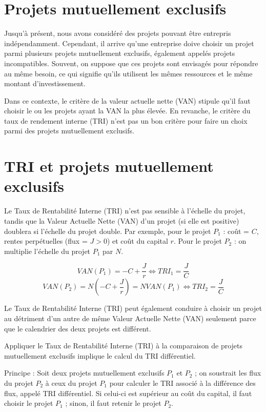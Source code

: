 \documentclass[a4paper, 12pt]{report}
\begin{document}
\section{Projets mutuellement exclusifs}

Jusqu'à présent, nous avons considéré des projets pouvant être entrepris indépendamment. Cependant, il arrive qu'une entreprise doive choisir un projet parmi plusieurs projets mutuellement exclusifs, également appelés projets incompatibles. Souvent, on suppose que ces projets sont envisagés pour répondre au même besoin, ce qui signifie qu'ils utilisent les mêmes ressources et le même montant d'investissement.

Dans ce contexte, le critère de la valeur actuelle nette (VAN) stipule qu'il faut choisir le ou les projets ayant la VAN la plus élevée. En revanche, le critère du taux de rendement interne (TRI) n'est pas un bon critère pour faire un choix parmi des projets mutuellement exclusifs.

\section{TRI et projets mutuellement exclusifs}

Le Taux de Rentabilité Interne (TRI) n'est pas sensible à l'échelle du projet, tandis que la Valeur Actuelle Nette (VAN) d'un projet (si elle est positive) doublera si l'échelle du projet double. Par exemple, pour le projet \( P_1 \) : coût = \( C \), rentes perpétuelles (flux = \( J > 0 \)) et coût du capital \( r \). Pour le projet \( P_2 \) : on multiplie l'échelle du projet \( P_1 \) par \( N \).

\[ VAN(P_1)=-C+\frac{J}{r}\Leftrightarrow TRI_1=\frac{J}{C} \]
\[ VAN(P_2)=N\left( -C+\frac{J}{r}\right) = NVAN(P_1)\Leftrightarrow TRI_2=\frac{J}{C} \]

Le Taux de Rentabilité Interne (TRI) peut également conduire à choisir un projet au détriment d'un autre de même Valeur Actuelle Nette (VAN) seulement parce que le calendrier des deux projets est différent.

Appliquer le Taux de Rentabilité Interne (TRI) à la comparaison de projets mutuellement exclusifs implique le calcul du TRI différentiel. 

Principe : Soit deux projets mutuellement exclusifs \( P_1 \) et \( P_2 \) ; on soustrait les flux du projet \( P_2 \) à ceux du projet \( P_1 \) pour calculer le TRI associé à la différence des flux, appelé TRI différentiel. Si celui-ci est supérieur au coût du capital, il faut choisir le projet \( P_1 \) ; sinon, il faut retenir le projet \( P_2 \). 
\end{document}
